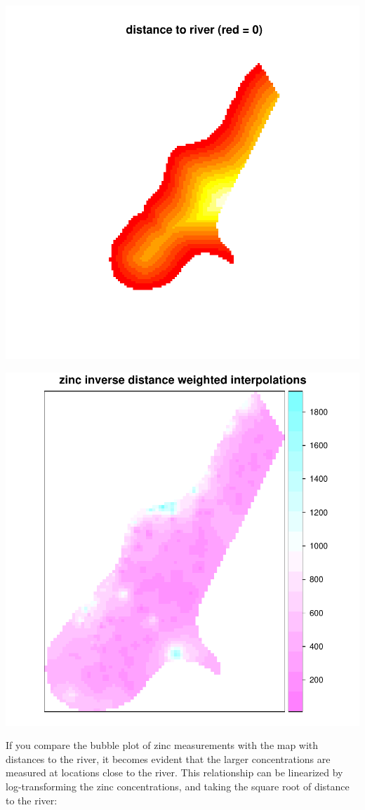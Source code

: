 \documentclass[a4paper]{article}
\begin{document}
\includegraphics{gstat-003}

\includegraphics{gstat-004}

If you compare the bubble plot of zinc measurements with the map with
distances to the river, it becomes evident that the larger concentrations
are measured at locations close to the river. This relationship can be
linearized by log-transforming the zinc concentrations, and taking the
square root of distance to the river:
\end{document}

